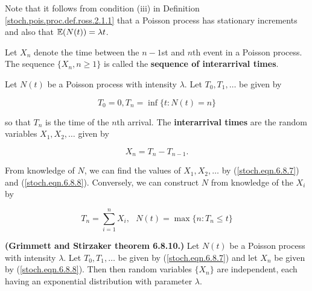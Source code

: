 \begin{remark} Note that it follows from condition (iii) in Definition \ref{stoch.pois.proc.def.ross.2.1.1} that a Poisson process has stationary increments and also that \(\mathbb{E}(N(t)) = \lambda t\).

\end{remark}


\begin{definition} Let \(X_n\) denote the time between the \(n-1\)st and \(n\)th event in a Poisson process. The sequence \(\{X_n, n \geq 1 \}\) is called the \textbf{sequence of interarrival times}.

\end{definition}

\begin{definition}
Let \(N(t)\) be a Poisson process with intensity \(\lambda\). Let \(T_0, T_1, \ldots\) be given by

\begin{equation}\label{stoch.eqn.6.8.7}
T_0 = 0, T_n = \inf \{t: N(t) = n\}
\end{equation}

so that \(T_n\) is the time of the \(n\)th arrival. The \textbf{interarrival times} are the random variables \(X_1, X_2, \ldots\) given by

\begin{equation}\label{stoch.eqn.6.8.8}
X_n = T_n - T_{n-1}.
\end{equation}

\end{definition}

\begin{remark}
From knowledge of \(N\), we can find the values of \(X_1, X_2, \ldots\) by (\ref{stoch.eqn.6.8.7}) and (\ref{stoch.eqn.6.8.8}). Conversely, we can construct \(N\) from knowledge of the \(X_i\) by

\begin{equation}\label{stoch.eqn.6.8.9}
T_n = \sum_{i=1}^n X_i, \ \ \  N(t) = \max\{n: T_n \leq t\}
\end{equation}
\end{remark}

\begin{theorem}
\textbf{(Grimmett and Stirzaker theorem 6.8.10.)}\label{stoch.pois.proc.inter.thm} Let \(N(t)\) be a Poisson process with intensity \(\lambda\). Let \(T_0, T_1, \ldots\) be given by (\ref{stoch.eqn.6.8.7}) and let \(X_n\) be given by (\ref{stoch.eqn.6.8.8}). Then then random variables \(\{X_n\}\) are independent, each having an exponential distribution with parameter \(\lambda\).
\end{theorem}


